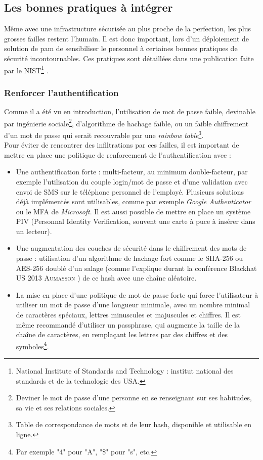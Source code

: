 \subsection{Les bonnes pratiques à intégrer}
\label{subsec:pratiques}

Même avec une infrastructure sécurisée au plus proche de la perfection, les plus grosses failles restent l'humain. Il est donc important, lors d'un déploiement de solution de \gls{pam} de sensibiliser le personnel à certaines bonnes pratiques de sécurité incontournables. Ces pratiques sont détaillées dans une publication faite par le \textsc{NIST}\footnote{National Institute of Standards and Technology : institut national des standards et de la technologie des USA.} \cite{nist}.

\subsubsection{Renforcer l'authentification}
\label{par:auth}

Comme il a été vu en introduction, l'utilisation de mot de passe faible, devinable par ingénierie sociale\footnote{Deviner le mot de passe d'une personne en se renseignant sur ses habitudes, sa vie et ses relations sociales.}, d'algorithme de hachage faible, ou un faible chiffrement d'un mot de passe qui serait recouvrable par une \emph{rainbow table}\footnote{Table de correspondance de mots et de leur hash, disponible et utilisable en ligne.}.\\
Pour éviter de rencontrer des infiltrations par ces failles, il est important de mettre en place une politique de renforcement de l'authentification avec :
\begin{itemize}
	\item Une authentification forte : multi-facteur, au minimum double-facteur, par exemple l'utilisation du couple login/mot de passe et d'une validation avec envoi de SMS sur le téléphone personnel de l'employé. Plusieurs solutions déjà implémentés sont utilisables, comme par exemple \emph{Google Authenticator} ou le MFA de \emph{Microsoft}. Il est aussi possible de mettre en place un système PIV (Personnal Identity Verification, souvent une carte à puce à insérer dans un lecteur).
	\item Une augmentation des couches de sécurité dans le chiffrement des mots de passe : utilisation d'un algorithme de hachage fort comme le SHA-256 ou AES-256 doublé d'un salage (comme l'explique durant la conférence Blackhat US 2013 \textsc{Aumasson} \cite{jpa}) de ce hash avec une chaîne aléatoire.
	\item La mise en place d'une politique de mot de passe forte qui force l'utilisateur à utiliser un mot de passe d'une longueur minimale, avec un nombre minimal de caractères spéciaux, lettres minuscules et majuscules et chiffres. Il est même recommandé d'utiliser un passphrase, qui augmente la taille de la chaîne de caractères, en remplaçant les lettres par des chiffres et des symboles\footnote{Par exemple "4" pour "A", "\$" pour "s", etc.}.
\end{itemize}

